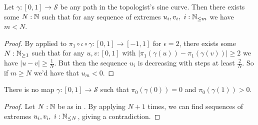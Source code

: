 \begin{lemma}\label{MaxLengthExtremeSeq}
  Let $\gamma:[0,1] \to \mathcal S$ be any path in the topologist's sine curve. Then there exists some $N:\mathbb{N}$ such that for any sequence of extremes $u_i,v_i,~i:\mathbb{N}_{\leq m}$ we have $m<N$. 
\end{lemma}
\begin{proof}
  By  applied to 
  $\pi_1\circ \iota \circ \gamma:[0,1] \to [-1,1]$ for $\epsilon = 2$, 
  there exists some $N:\mathbb{N}_{\geq1}$ such that for any $u,v:[0,1]$ with 
  $|\pi_1(\gamma(u))- \pi_1(\gamma(v))| \geq 2$ we have $|u-v|\geq \frac1N$. 
  But then the sequence $u_i$ is decreasing with steps at least $\frac2N$. So if $m\geq N$ we'd have that $u_m <0$. 
\end{proof}


\begin{theorem}\label{NotPathConnected}
  There is no map $\gamma:[0,1] \to \mathcal S$ such that $\pi_0(\gamma(0)) = 0$ and $\pi_0(\gamma(1)) > 0$. 
\end{theorem}
\begin{proof}
  Let $N:\mathbb{N}$ be as in .
  By applying  $N+1$ times, we can find sequences of extremes $u_i,v_i,~i:\mathbb{N}_{\leq N}$, giving a contradiction.
\end{proof}
